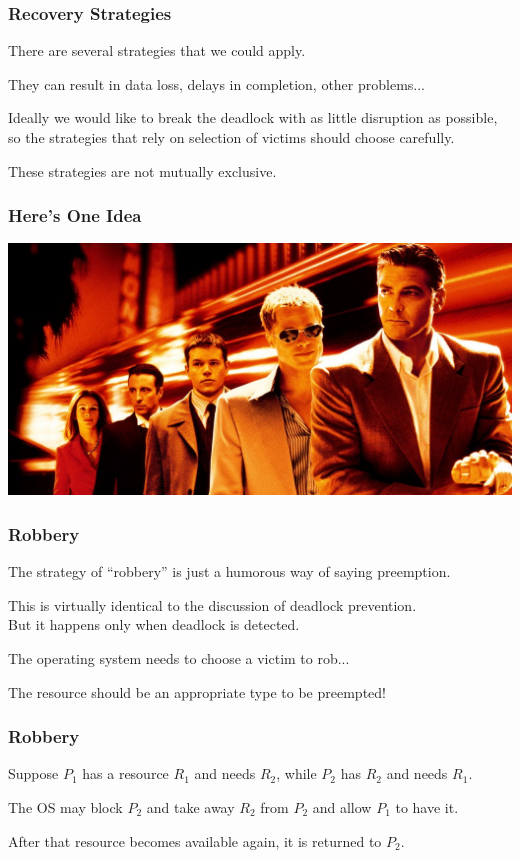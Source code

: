\begin{frame}
	\frametitle{Recovery Strategies}

	There are several strategies that we could apply.

	They can result in data loss, delays in completion, other problems...

	Ideally we would like to break the deadlock with as little disruption as possible, so the strategies that rely on selection of victims should choose carefully.

	These strategies are not mutually exclusive.

\end{frame}


\begin{frame}
	\frametitle{Here's One Idea}

	\begin{center}
		\includegraphics[width=\textwidth]{images/oceans-eleven.jpeg}
	\end{center}

\end{frame}


\begin{frame}
	\frametitle{Robbery}

	The strategy of ``robbery'' is just a humorous way of saying preemption.

	This is virtually identical to the discussion of deadlock prevention.\\
	\quad But it happens  only when deadlock is detected.

	The operating system needs to choose a victim to rob...

	The resource should be an appropriate type to be preempted!


\end{frame}

\begin{frame}
	\frametitle{Robbery}


	Suppose $P_{1}$ has a resource $R_{1}$ and needs $R_{2}$, while $P_{2}$ has $R_{2}$ and needs $R_{1}$.

	The OS may block $P_{2}$ and take away $R_{2}$ from $P_{2}$ and allow $P_{1}$ to have it.

	After that resource becomes available again, it is returned to $P_{2}$.


\end{frame}

